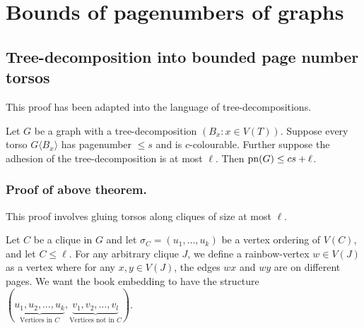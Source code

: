 \section{Bounds of pagenumbers of graphs}\label{sec:BoundedPagenumber}
\subsection{Tree-decomposition into bounded page number torsos}\label{ssec:Clique_sum_Pagenumber_bound}

This proof has been adapted into the language of tree-decompositions.
\begin{theorem}\label{thm:clique_sum_pagenumber_bound}
	Let \(G\) be a graph with a tree-decomposition \((B_x: x \in V(T))\). Suppose every torso \(G \langle B_x \rangle\) has pagenumber \(\leq s\) and is \(c\)-colourable. Further suppose the adhesion of the tree-decomposition is at most \(\ell\).
	Then \(\operatorname{pn}(G) \leq cs + \ell \).
\end{theorem}

\subsubsection{Proof of above theorem.}
This proof involves gluing torsos along cliques of size at most \( \ell \).

Let \(C\) be a clique in \(G\) and let \(\sigma_C = (u_1, \ldots , u_k)\) be a vertex ordering of \(V(C)\), and let \(C \leq \ell \). For any arbitrary clique \(J\), we define a rainbow-vertex \(w \in V(J)\) as a vertex where for any \(x, y \in V(J)\), the edges \(wx\) and \(wy\) are on different pages. We want the book embedding to have the structure \((\underbrace{u_1, u_2, \ldots, u_k}_{\text{Vertices in } C}, \underbrace{v_1, v_2, \ldots, v_l}_{\text{Vertices not in }C})\).

